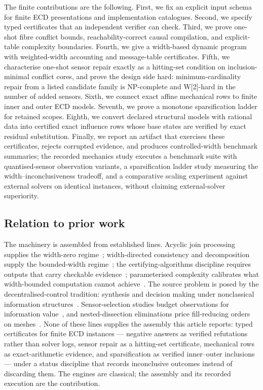 \documentclass[11pt]{article}
\theoremstyle{plain}
\theoremstyle{definition}
\theoremstyle{remark}
\begin{document}
The finite contributions are the following.  First, we fix an explicit input
schema for finite ECD presentations and implementation catalogues.  Second, we
specify typed certificates that an independent verifier can check.  Third, we
prove one-shot fibre conflict bounds, reachability-correct causal compilation,
and explicit-table complexity boundaries.  Fourth, we give a width-based dynamic
program with weighted-width accounting and message-table certificates.  Fifth,
we characterise one-shot sensor repair exactly as a hitting-set condition on
inclusion-minimal conflict cores, and prove the design side hard:
minimum-cardinality repair from a listed candidate family is NP-complete and
W[2]-hard in the number of added sensors.  Sixth, we connect exact affine mechanical
rows to finite inner and outer ECD models.  Seventh, we prove a monotone
sparsification ladder for retained scopes.  Eighth, we convert declared
structural models with rational data into certified exact influence rows whose
base states are verified by exact residual substitution.
Finally, we report an artifact that exercises these certificates, rejects
corrupted evidence, and produces controlled-width benchmark summaries; the
recorded mechanics study executes a benchmark suite with quantised-sensor
observation variants, a sparsification ladder study measuring the
width--inconclusiveness tradeoff, and a comparative scaling experiment against
external solvers on identical instances, without claiming external-solver
superiority.

\subsection*{Relation to prior work}

The machinery is assembled from established lines.  Acyclic join processing
supplies the width-zero regime~\cite{yannakakis81}; width-directed consistency
and decomposition supply the bounded-width
regime~\cite{freuder82,dechter03,bodlaender-koster08}; the
certifying-algorithms discipline requires outputs that carry checkable
evidence~\cite{mcm11}; parameterised complexity calibrates what width-bounded
computation cannot achieve~\cite{downey-fellows99,impagliazzo-paturi01}.
The source problem is posed by the decentralised-control tradition: synthesis
and decision making under nonclassical information
structures~\cite{witsenhausen71,papadimitrioutsitsiklis86,bernstein02}.
Sensor-selection studies budget observations for information
value~\cite{krauseguestrin07}, and nested-dissection eliminations price
fill-reducing orders on meshes~\cite{george73,liptontarjan79}.  None of these
lines supplies the assembly this article reports: typed certificates for
finite ECD instances --- negative answers as verified refutations rather than
solver logs, sensor repair as a hitting-set certificate, mechanical rows as
exact-arithmetic evidence, and sparsification as verified inner--outer
inclusions --- under a status discipline that records inconclusive outcomes
instead of discarding them.  The engines are classical; the assembly and its
recorded execution are the contribution.
\end{document}
